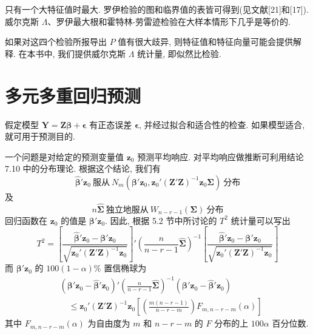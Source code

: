 
只有一个大特征值时最大. 罗伊检验的图和临界值的表皆可得到(见文献[21]和[17]). 威尔克斯 $\Lambda$、罗伊最大根和霍特林-劳雷迹检验在大样本情形下几乎是等价的.

如果对这四个检验所报导出 $P$ 值有很大歧异, 则特征值和特征向量可能会提供解释. 在本书中, 我们提供威尔克斯 $\Lambda$ 统计量, 即似然比检验.

\section{多元多重回归预测}
\label{sec:7.10}

假定模型 $\mathbf{Y}=\mathbf{Z}\boldsymbol{\beta}+\boldsymbol{\epsilon}$ 有正态误差 $\boldsymbol{\epsilon}$, 并经过拟合和适合性的检查. 如果模型适合, 就可用于预测目的.

一个问题是对给定的预测变量值 $\mathbf{z}_0$ 预测平均响应. 对平均响应做推断可利用结论 7.10 中的分布理论. 根据这个结论, 我们有
\[
\hat{\boldsymbol{\beta}}'\mathbf{z}_0\ \text{服从}\ N_m(\boldsymbol{\beta}'\mathbf{z}_0,\mathbf{z}_0'(\mathbf{Z}'\mathbf{Z})^{-1}\mathbf{z}_0\boldsymbol{\Sigma})\ \text{分布}
\]
及
\[
n\hat{\boldsymbol{\Sigma}}\ \text{独立地服从}\ W_{n-r-1}(\boldsymbol{\Sigma})\ \text{分布}
\]
回归函数在 $\mathbf{z}_0$ 的值是 $\boldsymbol{\beta}'\mathbf{z}_0$. 因此, 根据 5.2 节中所讨论的 $T^2$ 统计量可以写出
\label{eq:7-39}
\begin{equation}
T^2=\left[\frac{\hat{\boldsymbol{\beta}}'\mathbf{z}_0-\boldsymbol{\beta}'\mathbf{z}_0}{\sqrt{\mathbf{z}_0'(\mathbf{Z}'\mathbf{Z})^{-1}\mathbf{z}_0}}\right]'
\left(\frac{n}{n-r-1}\hat{\boldsymbol{\Sigma}}\right)^{-1}
\left[\frac{\hat{\boldsymbol{\beta}}'\mathbf{z}_0-\boldsymbol{\beta}'\mathbf{z}_0}{\sqrt{\mathbf{z}_0'(\mathbf{Z}'\mathbf{Z})^{-1}\mathbf{z}_0}}\right]
\tag{7-39}
\end{equation}
而 $\boldsymbol{\beta}'\mathbf{z}_0$ 的 $100(1-\alpha)\%$ 置信椭球为
\label{eq:7-40}
\begin{equation}
\begin{aligned}
&(\boldsymbol{\beta}'\mathbf{z}_0-\hat{\boldsymbol{\beta}}'\mathbf{z}_0)'\left(\frac{n}{n-r-1}\hat{\boldsymbol{\Sigma}}\right)^{-1}(\boldsymbol{\beta}'\mathbf{z}_0-\hat{\boldsymbol{\beta}}'\mathbf{z}_0)\\
&\quad\leqslant\mathbf{z}_0'(\mathbf{Z}'\mathbf{Z})^{-1}\mathbf{z}_0\left[\left(\frac{m(n-r-1)}{n-r-m}\right)F_{m,n-r-m}(\alpha)\right]
\end{aligned}
\tag{7-40}
\end{equation}
其中 $F_{m,n-r-m}(\alpha)$ 为自由度为 $m$ 和 $n-r-m$ 的 $F$ 分布的上 $100\alpha$ 百分位数.

